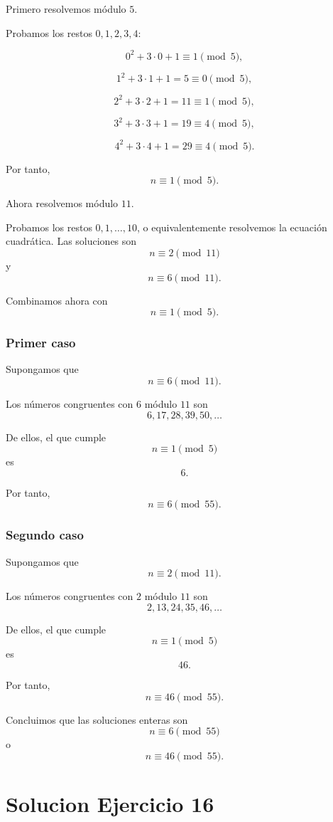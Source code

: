 \documentclass[12pt]{article}
\begin{document}
Primero resolvemos módulo \(5\).

Probamos los restos \(0,1,2,3,4\):

\[
0^2+3\cdot 0+1\equiv 1\pmod 5,
\]

\[
1^2+3\cdot 1+1=5\equiv 0\pmod 5,
\]

\[
2^2+3\cdot 2+1=11\equiv 1\pmod 5,
\]

\[
3^2+3\cdot 3+1=19\equiv 4\pmod 5,
\]

\[
4^2+3\cdot 4+1=29\equiv 4\pmod 5.
\]

Por tanto,
\[
n\equiv 1\pmod 5.
\]

Ahora resolvemos módulo \(11\).

Probamos los restos \(0,1,\dots,10\), o equivalentemente resolvemos la ecuación cuadrática. Las soluciones son
\[
n\equiv 2\pmod {11}
\]
y
\[
n\equiv 6\pmod {11}.
\]

Combinamos ahora con
\[
n\equiv 1\pmod 5.
\]

\subsubsection*{Primer caso}

Supongamos que
\[
n\equiv 6\pmod {11}.
\]

Los números congruentes con \(6\) módulo \(11\) son
\[
6,17,28,39,50,\dots
\]

De ellos, el que cumple
\[
n\equiv 1\pmod 5
\]
es
\[
6.
\]

Por tanto,
\[
n\equiv 6\pmod {55}.
\]

\subsubsection*{Segundo caso}

Supongamos que
\[
n\equiv 2\pmod {11}.
\]

Los números congruentes con \(2\) módulo \(11\) son
\[
2,13,24,35,46,\dots
\]

De ellos, el que cumple
\[
n\equiv 1\pmod 5
\]
es
\[
46.
\]

Por tanto,
\[
n\equiv 46\pmod {55}.
\]

Concluimos que las soluciones enteras son
\[
\boxed{n\equiv 6\pmod {55}}
\]
o
\[
\boxed{n\equiv 46\pmod {55}}.
\]

\section*{Solucion Ejercicio 16}
\end{document}
